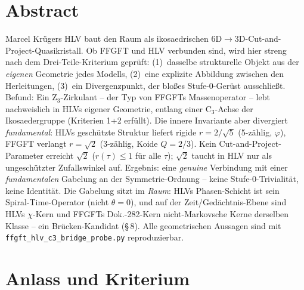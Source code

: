 
\section*{Abstract}
Marcel Krügers HLV baut den Raum als ikosaedrischen 6D$\to$3D-Cut-and-Project-Quasikristall.
Ob FFGFT und HLV verbunden sind, wird hier streng nach dem Drei-Teile-Kriterium
geprüft: (1)~dasselbe strukturelle Objekt aus der \emph{eigenen} Geometrie jedes
Modells, (2)~eine explizite Abbildung zwischen den Herleitungen, (3)~ein
Divergenzpunkt, der bloßes Stufe-0-Gerüst ausschließt. Befund: Ein
Z$_3$-Zirkulant -- der Typ von FFGFTs Massenoperator -- lebt nachweislich in HLVs
eigener Geometrie, entlang einer C$_3$-Achse der Ikosaedergruppe (Kriterien 1+2
erfüllt). Die innere Invariante aber divergiert \emph{fundamental}: HLVs
geschützte Struktur liefert rigide $r=2/\sqrt5$ (5-zählig, $\varphi$), FFGFT
verlangt $r=\sqrt2$ (3-zählig, Koide $Q=2/3$). Kein Cut-and-Project-Parameter
erreicht $\sqrt2$ ($r(\tau)\le1$ für alle $\tau$); $\sqrt2$ taucht in HLV nur als
ungeschützter Zufallswinkel auf. Ergebnis: eine \emph{genuine} Verbindung mit
einer \emph{fundamentalen} Gabelung an der Symmetrie-Ordnung -- keine
Stufe-0-Trivialität, keine Identität. Die Gabelung sitzt im \emph{Raum}: HLVs
Phasen-Schicht ist sein Spiral-Time-Operator (nicht $\theta=0$), und auf der
Zeit/Gedächtnis-Ebene sind HLVs $\chi$-Kern und FFGFTs Dok.-282-Kern
nicht-Markovsche Kerne derselben Klasse -- ein Brücken-Kandidat (§\,8). Alle
geometrischen Aussagen sind mit
\texttt{ffgft\_hlv\_c3\_bridge\_probe.py} reproduzierbar.

\section{Anlass und Kriterium}


